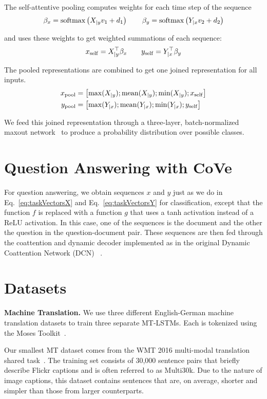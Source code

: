 \documentclass{article}
\newcommand{\softmax}[1]{{\rm softmax} \left( #1 \right)}
\begin{document}
The self-attentive pooling computes weights for each time step of the sequence 
\begin{equation}
\beta_{x} = \softmax{X_{|y}v_1 + d_1}
\qquad
\beta_{y} = \softmax{Y_{|x}v_2 + d_2}
\end{equation}

and uses these weights to get weighted summations of each sequence:
\begin{equation}
x_{\rm self} = X_{|y}^\top \beta_{x}
\qquad
y_{\rm self} = Y_{|x}^\top \beta_{y}
\end{equation}

The pooled representations are combined to get one joined representation for all inputs. 
\begin{align}
x_{\rm pool} &= \left [ \max(X_{|y}); {\rm mean}(X_{|y}); \min(X_{|y}); x_{\rm self} \right ]
\\
y_{\rm pool} &= \left [ \max(Y_{|x}); {\rm mean}(Y_{|x}); \min(Y_{|x});  y_{\rm self} \right ]
\end{align}

We feed this joined representation through a three-layer, 
batch-normalized~\citep{Ioffe2015BatchNA} maxout network~\citep{Goodfellow2013MaxoutN} 
to produce a probability distribution over possible classes.

\section{Question Answering with CoVe}

For question answering, 
we obtain sequences $x$ and $y$ just as we do in Eq.~\ref{eq:taskVectorsX} and Eq.~\ref{eq:taskVectorsY} for classification, except that the function $f$ is replaced with a function $g$ that uses a tanh activation instead of a ReLU activation.
In this case, one of the sequences is the document and the other the question in the question-document pair.
These sequences are then fed through the coattention and dynamic decoder implemented as in the original Dynamic Coattention Network (DCN) ~\citep{xiong2016dynamic}.  \section{Datasets}

\textbf{Machine Translation.} 
We use three different English-German machine translation datasets to train three separate MT-LSTMs. 
Each is tokenized using the Moses Toolkit~\citep{Koehn2007}.

Our smallest MT dataset comes from the WMT 2016 multi-modal translation shared task~\citep{Specia2016}.
The training set consists of 30,000 sentence pairs that briefly describe Flickr captions and is often referred to as Multi30k.
Due to the nature of image captions, this dataset contains sentences that are, on average, shorter and simpler than those from larger counterparts.
\end{document}
